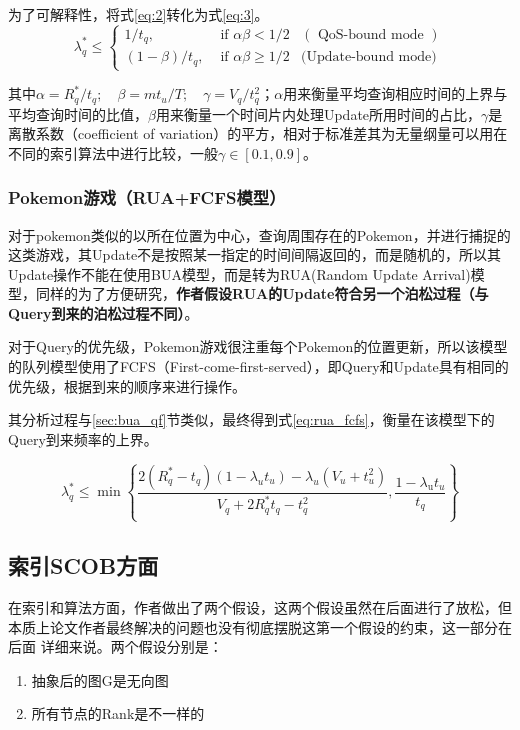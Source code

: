 \documentclass{ML}
\begin{document}
为了可解释性，将式\eqref{eq:2}转化为式\eqref{eq:3}。
\begin{equation}
\lambda_{q}^{*} \leq \left\{
\begin{array}{lll}
{1 / t_{q},} & {\text { if } \alpha \beta<1 / 2} & {(\text { QoS-bound mode })} \\ 
{(1-\beta) / t_{q},} & {\text { if } \alpha \beta \geq 1 / 2} &\text {(Update-bound mode)}
\end{array}
\right.
\label{eq:3}
\end{equation}

其中$\alpha=R_{q}^{*} / t_{q} ; \quad \beta=m t_{u} / T ; \quad \gamma=V_{q} / t_{q}^{2}$；$\alpha$用来衡量平均查询相应时间的上界与平均查询时间的比值，$\beta$用来衡量一个时间片内处理Update所用时间的占比，$\gamma$是离散系数（coefficient of variation）的平方，相对于标准差其为无量纲量可以用在不同的索引算法中进行比较，一般$\gamma \in [0.1, 0.9]$。	

\subsubsection{Pokemon游戏（RUA+FCFS模型）}
对于pokemon类似的以所在位置为中心，查询周围存在的Pokemon，并进行捕捉的这类游戏，其Update不是按照某一指定的时间间隔返回的，而是随机的，所以其Update操作不能在使用BUA模型，而是转为RUA(Random Update Arrival)模型，同样的为了方便研究，\textbf{作者假设RUA的Update符合另一个泊松过程（与Query到来的泊松过程不同）}。

对于Query的优先级，Pokemon游戏很注重每个Pokemon的位置更新，所以该模型的队列模型使用了FCFS（First-come-first-served），即Query和Update具有相同的优先级，根据到来的顺序来进行操作。

其分析过程与\ref{sec:bua_qf}节类似，最终得到式\eqref{eq:rua_fcfs}，衡量在该模型下的Query到来频率的上界。

\begin{equation}
\lambda_{q}^{*} \leq \min \left\{\frac{2\left(R_{q}^{*}-t_{q}\right)\left(1-\lambda_{u} t_{u}\right)-\lambda_{u}\left(V_{u}+t_{u}^{2}\right)}{V_{q}+2 R_{q}^{*} t_{q}-t_{q}^{2}}, \frac{1-\lambda_{\mathrm{u}} t_{u}}{t_{q}}\right\}
\label{eq:rua_fcfs}
\end{equation}

\subsection{索引SCOB方面}
在索引和算法方面，作者做出了两个假设，这两个假设虽然在后面进行了放松，但本质上论文作者最终解决的问题也没有彻底摆脱这第一个假设的约束，这一部分在后面%
详细来说。两个假设分别是：
\begin{enumerate}
	\item 抽象后的图G是无向图
	\item 所有节点的Rank是不一样的
\end{enumerate}
\end{document}
